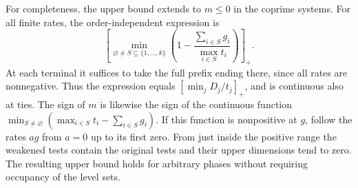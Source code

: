 \documentclass[11pt,a4paper,reqno]{amsart}
\theoremstyle{definition}
\theoremstyle{remark}
\numberwithin{equation}{section}
\begin{document}
For completeness, the upper bound extends to \(m\le0\) in the coprime systems. For all finite rates, the order-independent expression is
\[
  \left[\min_{\varnothing\ne S\subseteq\{1,\ldots,k\}}
       \left(1-\frac{\sum_{i\in S}g_i}{\max_{i\in S}t_i}\right)\right]_+ .
\]
At each terminal it suffices to take the full prefix ending there, since all rates are nonnegative. Thus the expression equals \([\min_jD_j/t_j]_+\), and is continuous also at ties. The sign of \(m\) is likewise the sign of the continuous function \(\min_{S\ne\varnothing}(\max_{i\in S}t_i-\sum_{i\in S}g_i)\). If this function is nonpositive at \(g\), follow the rates \(a g\) from \(a=0\) up to its first zero. From just inside the positive range the weakened tests contain the original tests and their upper dimensions tend to zero. The resulting upper bound holds for arbitrary phases without requiring occupancy of the level sets.
\end{document}
